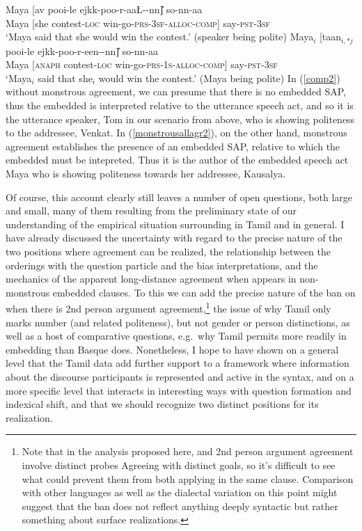 \documentclass[output=paper, modfonts, nonflat]{langsci/langscibook}
\begin{document}
\ea\label{monnomon}
 \ea\label{comp2}\gll Maya [av\A{} poo\textrtailt\textrtailt i-le \J
 ejkk\A-poo-r-aa\L-\nga-nn\U] so-nn-aa\\  
 Maya [she contest-\textsc{loc}{} win-go-\textsc{prs}-3\textsc{sf}-\textsc{alloc}-\textsc{comp}]
 say-\textsc{pst}-3\textsc{sf}\\ 
 \glt `Maya said that she would win the contest.' (speaker being polite)
 \ex\label{monstrousallagr2}\gll Maya$_i$ [taan$_{i,*j}$ poo\textrtailt\textrtailt i-le \J
 ejkk\A-poo-r-een-\nga-nn\U] so-nn-aa\\  
 Maya [\textsc{anaph} contest-\textsc{loc}{} win-go-\textsc{prs}-1\textsc{s}-\textsc{alloc}-\textsc{comp}]
 say-\textsc{pst}-3\textsc{sf}\\ \vspace{-0.25cm}
 \glt `Maya$_i$ said that she$_i$ would win the contest.' (Maya being polite)
 \z
\z
%
In (\ref{comp2}) without monstrous agreement, we can presume that
there is no embedded SAP, thus the embedded \allagr{} is interpreted
relative to the utterance speech act, and so it is the utterance
speaker, Tom in our scenario from above, who is showing politeness to
the addressee, Venkat. In (\ref{monstrousallagr2}), on the other hand,
monstrous agreement establishes the presence of an embedded SAP,
relative to which the embedded \allagr{} must be intepreted. Thus it
is the author of the embedded speech act Maya who is showing
politeness towards her addressee, Kausalya.

Of course, this account clearly still leaves a number of open
questions, both large and small, many of them resulting from the
preliminary state of our understanding of the empirical situation
surrounding \allagr{} in Tamil and in general. I have already
discussed the uncertainty with regard to the precise nature of the two
positions where agreement can be realized, the relationship between
the orderings with the question particle and the bias interpretations,
and the mechanics of the apparent long-distance agreement when
\allagr{} appears in non-monstrous embedded clauses. To this we can
add the precise nature of the ban on \allagr{} when there is 2nd
person argument agreement,\footnote{Note that in the analysis proposed
  here, \allagr{} and 2nd person argument agreement involve distinct
  probes Agreeing with distinct goals, so it's difficult to see what
  could prevent them from both applying in the same clause. Comparison
  with other languages as well as the dialectal variation on this
  point might suggest that the ban does not reflect anything deeply
  syntactic but rather something about surface realizations.} the
issue of why Tamil \allagr{} only marks number (and related
politeness), but not gender or person distinctions, as well as a host
of comparative questions, e.g.\ why Tamil permits \allagr{} more
readily in embedding than Basque does. Nonetheless, I hope to have
shown on a general level that the Tamil data add further support to a
framework where information about the discourse participants is
represented and active in the syntax, and on a more specific level
that \allagr{} interacts in interesting ways with question formation
and indexical shift, and that we should recognize two distinct
positions for its realization.
\newpage
\end{document}
